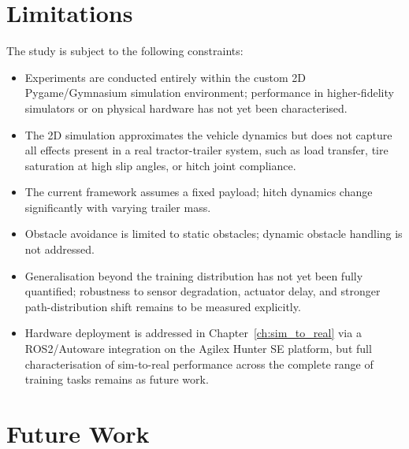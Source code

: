 \section{Limitations}

The study is subject to the following constraints:
\begin{itemize}
    \item Experiments are conducted entirely within the custom 2D Pygame/Gymnasium simulation environment; performance in higher-fidelity simulators or on physical hardware has not yet been characterised.
    \item The 2D simulation approximates the vehicle dynamics but does not capture all effects present in a real tractor-trailer system, such as load transfer, tire saturation at high slip angles, or hitch joint compliance.
    \item The current framework assumes a fixed payload; hitch dynamics change significantly with varying trailer mass.
    \item Obstacle avoidance is limited to static obstacles; dynamic obstacle handling is not addressed.
    \item Generalisation beyond the training distribution has not yet been fully quantified; robustness to sensor degradation, actuator delay, and stronger path-distribution shift remains to be measured explicitly.
    \item Hardware deployment is addressed in Chapter~\ref{ch:sim_to_real} via a ROS2/Autoware integration on the Agilex Hunter SE platform, but full characterisation of sim-to-real performance across the complete range of training tasks remains as future work.
\end{itemize}

\section{Future Work}

